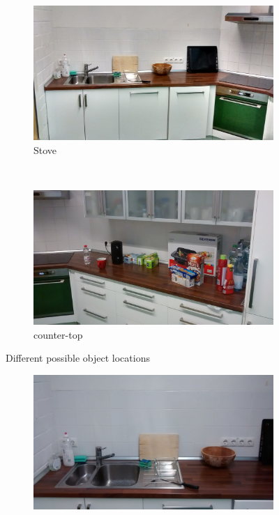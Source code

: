 \documentclass{article}
\begin{document}
{\begin{figure}
\begin{subfigure}[b]{0.3\textwidth}
        \includegraphics[width=\textwidth]{images/stove.jpg}
        \caption{Stove}
        \label{fig:stove}
    \end{subfigure}
    ~ %
    \begin{subfigure}[b]{0.3\textwidth}
        \includegraphics[width=\textwidth]{images/counter-top.jpg}
        \caption{counter-top}
        \label{fig:counter-top}
    \end{subfigure}
    \caption{Different possible object locations}\label{fig:alllocations}
\end{figure}
\begin{figure}
    \centering
    \begin{subfigure}[b]{0.3\textwidth}
        \includegraphics[width=\textwidth]{images/sink.jpg}

\end{subfigure}
\end{figure}}
\end{document}
